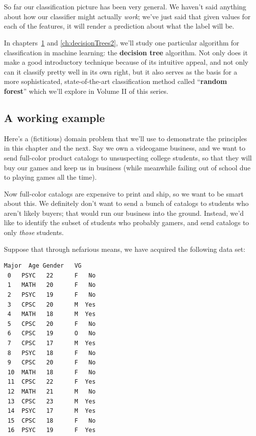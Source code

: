 
\chapter[Decision trees (1 of 2)]{\huge\selectfont{Decision
trees for classification (1 of 2)}}
\label{ch:decisionTrees1}

So far our classification picture has been very general. We haven't said
anything about how our classifier might actually \textit{work}; we've just said
that given values for each of the features, it will render a prediction about
what the label will be.


In chapters~\ref{ch:decisionTrees1} and \ref{ch:decisionTrees2}, we'll study
one particular algorithm for classification in machine learning: the
\textbf{decision tree} algorithm. Not only does it make a good introductory
technique because of its intuitive appeal, and not only can it classify pretty
well in its own right, but it also serves as the basis for a more
sophisticated, state-of-the-art classification method called ``\textbf{random
forest}'' which we'll explore in Volume II of this series.

\section{A working example}

 

Here's a (fictitious) domain problem that
we'll use to demonstrate the principles in this chapter and the next. Say we
own a videogame business, and we want to send full-color product catalogs to
unsuspecting college students, so that they will buy our games and keep us in
business (while meanwhile failing out of school due to playing games all the
time).

Now full-color catalogs are expensive to print and ship, so we want to be smart
about this. We definitely don't want to send a bunch of catalogs to students
who aren't likely buyers; that would run our business into the ground. Instead,
we'd like to identify the subset of students who probably gamers, and send
catalogs to only \textit{those} students.

Suppose that through nefarious means, we have acquired the following data set:

\begin{Verbatim}[fontsize=\small,samepage=true,frame=single,framesep=3mm,xleftmargin=2.8cm,xrightmargin=2.7cm]
    Major  Age Gender   VG
 0   PSYC   22      F   No
 1   MATH   20      F   No
 2   PSYC   19      F   No
 3   CPSC   20      M  Yes
 4   MATH   18      M  Yes
 5   CPSC   20      F   No
 6   CPSC   19      O   No
 7   CPSC   17      M  Yes
 8   PSYC   18      F   No
 9   CPSC   20      F   No
 10  MATH   18      F   No
 11  CPSC   22      F  Yes
 12  MATH   21      M   No
 13  CPSC   23      M  Yes
 14  PSYC   17      M  Yes
 15  CPSC   18      F   No
 16  PSYC   19      F  Yes
\end{Verbatim}

